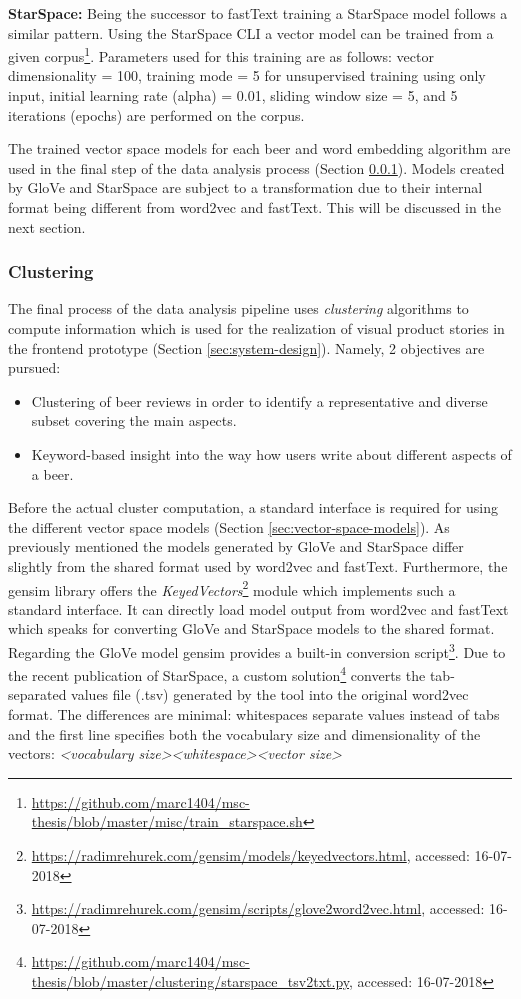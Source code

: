 \hfill

\noindent
\textbf{StarSpace:} Being the successor to fastText training a StarSpace model follows a similar pattern.
Using the StarSpace CLI a vector model can be trained from a given corpus\footnote{\url{https://github.com/marc1404/msc-thesis/blob/master/misc/train_starspace.sh}}.
Parameters used for this training are as follows: vector dimensionality = 100, training mode = 5 for unsupervised training using only input, initial learning rate (alpha) = 0.01, sliding window size = 5, and 5 iterations (epochs) are performed on the corpus.

\hfill

The trained vector space models for each beer and word embedding algorithm are used in the final step of the data analysis process (Section \ref{sec:clustering}).
Models created by GloVe and StarSpace are subject to a transformation due to their internal format being different from word2vec and fastText.
This will be discussed in the next section.


\subsubsection{Clustering} \label{sec:clustering}
The final process of the data analysis pipeline uses \textit{clustering} algorithms to compute information which is used for the realization of visual product stories in the frontend prototype (Section \ref{sec:system-design}).
Namely, 2 objectives are pursued:
\begin{itemize}
	\item Clustering of beer reviews in order to identify a representative and diverse subset covering the main aspects.
	\item Keyword-based insight into the way how users write about different aspects of a beer.
\end{itemize}

Before the actual cluster computation, a standard interface is required for using the different vector space models (Section \ref{sec:vector-space-models}).
As previously mentioned the models generated by GloVe and StarSpace differ slightly from the shared format used by word2vec and fastText.
Furthermore, the gensim library offers the \textit{KeyedVectors}\footnote{\url{https://radimrehurek.com/gensim/models/keyedvectors.html}, accessed: 16-07-2018} module which implements such a standard interface.
It can directly load model output from word2vec and fastText which speaks for converting GloVe and StarSpace models to the shared format.
Regarding the GloVe model gensim provides a built-in conversion script\footnote{\url{https://radimrehurek.com/gensim/scripts/glove2word2vec.html}, accessed: 16-07-2018}.
Due to the recent publication of StarSpace, a custom solution\footnote{\url{https://github.com/marc1404/msc-thesis/blob/master/clustering/starspace_tsv2txt.py}, accessed: 16-07-2018} converts the tab-separated values file (.tsv) generated by the tool into the original word2vec format.
The differences are minimal: whitespaces separate values instead of tabs and the first line specifies both the vocabulary size and dimensionality of the vectors: \textit{<vocabulary size><whitespace><vector size>}


